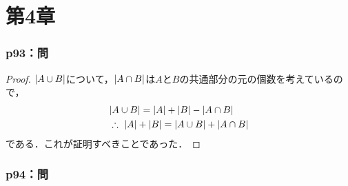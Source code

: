 \documentclass[a4paper,10pt,fleqn]{ltjsarticle}
\begin{document}
\part*{第4章}



\section*{p93：問}

\begin{leftbar}
    \begin{proof}
        $\abs{A \cup B}$について，$ \abs{A \cap B}$は$A$と$B$の共通部分の元の個数を考えているので，
        \begin{align*}
             & \abs{A \cup B} = \abs{A}+\abs{B} - \abs{A \cap B}              \\
             & \therefore ~ \abs{A}+\abs{B} = \abs{A \cup B} + \abs{A \cap B}
        \end{align*}
        である．これが証明すべきことであった．
    \end{proof}
\end{leftbar}

\newpage


\section*{p94：問}
\end{document}
